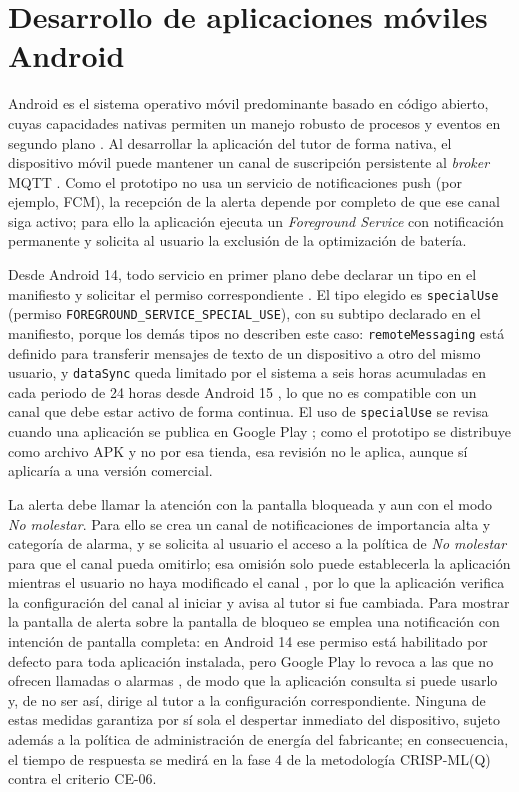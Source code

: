 \documentclass[12pt,a4paper,oneside]{book}
\theoremstyle{plain}
\theoremstyle{definition}
\theoremstyle{remark}
\begin{document}
\section{Desarrollo de aplicaciones móviles Android}
\label{sec:android}
Android es el sistema operativo móvil predominante basado en código abierto, cuyas capacidades nativas permiten un manejo robusto de procesos y eventos en segundo plano \parencite{uv2026desarrollo}. Al desarrollar la aplicación del tutor de forma nativa, el dispositivo móvil puede mantener un canal de suscripción persistente al \textit{broker} MQTT \parencite{oasis2019mqtt5}. Como el prototipo no usa un servicio de notificaciones push (por ejemplo, FCM), la recepción de la alerta depende por completo de que ese canal siga activo; para ello la aplicación ejecuta un \textit{Foreground Service} con notificación permanente y solicita al usuario la exclusión de la optimización de batería.

Desde Android 14, todo servicio en primer plano debe declarar un tipo en el manifiesto y solicitar el permiso correspondiente \parencite{android2026fgstypes}. El tipo elegido es \texttt{specialUse} (permiso \texttt{FOREGROUND\_SERVICE\_SPECIAL\_USE}), con su subtipo declarado en el manifiesto, porque los demás tipos no describen este caso: \texttt{remoteMessaging} está definido para transferir mensajes de texto de un dispositivo a otro del mismo usuario, y \texttt{dataSync} queda limitado por el sistema a seis horas acumuladas en cada periodo de 24 horas desde Android 15 \parencite{android2026fgstimeout}, lo que no es compatible con un canal que debe estar activo de forma continua. El uso de \texttt{specialUse} se revisa cuando una aplicación se publica en Google Play \parencite{android2026fgstypes}; como el prototipo se distribuye como archivo APK y no por esa tienda, esa revisión no le aplica, aunque sí aplicaría a una versión comercial.

La alerta debe llamar la atención con la pantalla bloqueada y aun con el modo \textit{No molestar}. Para ello se crea un canal de notificaciones de importancia alta y categoría de alarma, y se solicita al usuario el acceso a la política de \textit{No molestar} para que el canal pueda omitirlo; esa omisión solo puede establecerla la aplicación mientras el usuario no haya modificado el canal \parencite{android2026notificationchannel}, por lo que la aplicación verifica la configuración del canal al iniciar y avisa al tutor si fue cambiada. Para mostrar la pantalla de alerta sobre la pantalla de bloqueo se emplea una notificación con intención de pantalla completa: en Android 14 ese permiso está habilitado por defecto para toda aplicación instalada, pero Google Play lo revoca a las que no ofrecen llamadas o alarmas \parencite{aosp2026fsi}, de modo que la aplicación consulta si puede usarlo y, de no ser así, dirige al tutor a la configuración correspondiente. Ninguna de estas medidas garantiza por sí sola el despertar inmediato del dispositivo, sujeto además a la política de administración de energía del fabricante; en consecuencia, el tiempo de respuesta se medirá en la fase 4 de la metodología CRISP-ML(Q) contra el criterio CE-06.
\end{document}
